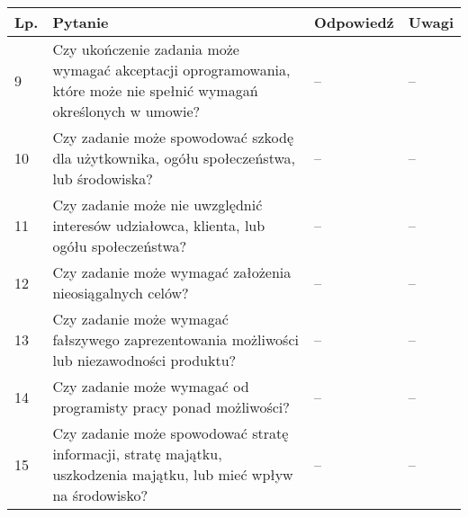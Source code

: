 \documentclass[11pt,oneside,a4paper,titlepage,onecolumn]{article}
\begin{document}
\begin{tabularx}{\textwidth}{|l|X|l|X|}
    \hline
    Lp. & Pytanie & Odpowiedź & Uwagi \\ \hline

	9
	& Czy ukończenie zadania może wymagać akceptacji oprogramowania, które może
    nie spełnić wymagań określonych w umowie?
	& --
	& --
	\\\hline

	10
	& Czy zadanie może spowodować szkodę dla użytkownika, ogółu społeczeństwa, lub
    środowiska?
	& --
	& --
	\\\hline

	11
	& Czy zadanie może nie uwzględnić interesów udziałowca, klienta, lub ogółu
    społeczeństwa?
	& --
	& --
	\\\hline

	12
	& Czy zadanie może wymagać założenia nieosiągalnych celów?
	& --
	& --
	\\\hline

	13
	& Czy zadanie może wymagać fałszywego zaprezentowania możliwości lub
    niezawodności produktu?
	& --
	& --
	\\\hline

	14
	& Czy zadanie może wymagać od programisty pracy ponad możliwości?
	& --
	& --
	\\\hline

	15
	& Czy zadanie może spowodować stratę informacji, stratę majątku, uszkodzenia
    majątku, lub mieć wpływ na środowisko?
	& --
	& --
	\\\hline
\end{tabularx}
\end{document}
